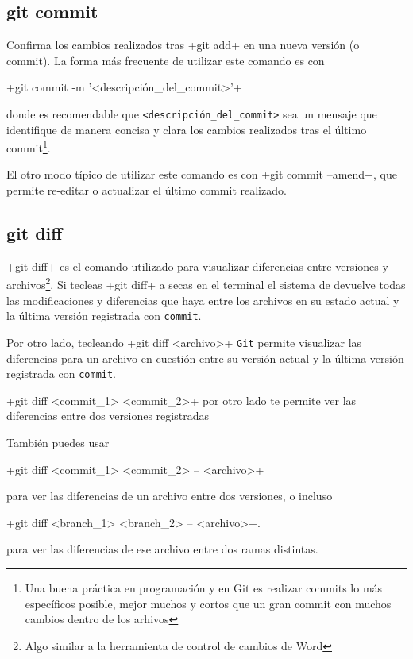 \documentclass[a5paper, oneside,10pt]{article}
\begin{document}
    \subsection{git commit}
      Confirma los cambios realizados tras \cverb+git add+ en una nueva versión (o commit). La forma más frecuente de utilizar este comando es con
      
      \cverb+git commit -m '<descripción_del_commit>'+
      
      donde es recomendable que \verb+<descripción_del_commit>+ sea un mensaje que identifique de manera concisa y clara los cambios realizados tras el último commit\footnote{Una buena práctica en programación y en Git es realizar commits lo más específicos posible, mejor muchos y cortos que un gran commit con muchos cambios dentro de los arhivos}. 
      
      El otro modo típico de utilizar este comando es con \cverb+git commit --amend+, que permite re-editar o actualizar el último commit realizado.
      
    \subsection{git diff}
    \cverb+git diff+ es el comando utilizado para visualizar diferencias entre versiones y archivos\footnote{Algo similar a la herramienta de control de cambios de Word}. Si tecleas \cverb+git diff+ a secas en el terminal el sistema de devuelve todas las modificaciones y diferencias que haya entre los archivos en su estado actual y la última versión registrada con \verb+commit+.
    
    Por otro lado, tecleando \cverb+git diff <archivo>+ \verb+Git+ permite visualizar las diferencias para un archivo en cuestión entre su versión actual y la última versión registrada con \verb+commit+.
    
    \cverb+git diff <commit_1> <commit_2>+ por otro lado te permite ver las diferencias entre dos versiones registradas
    
    También puedes usar 
    
    \cverb+git diff <commit_1> <commit_2> -- <archivo>+ 
    
    para ver las diferencias de un archivo entre dos versiones, o incluso 
    
    \cverb+git diff <branch_1> <branch_2> -- <archivo>+.
    
    para ver las diferencias de ese archivo entre dos ramas distintas.
    
\end{document}
